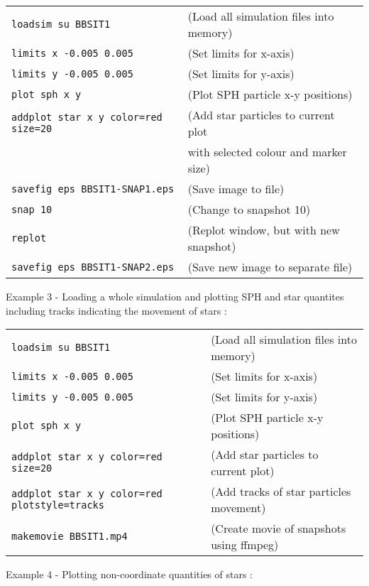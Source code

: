 \documentclass[a4paper]{article}
\newcommand{\var}[1]{\texttt{#1}}
\begin{document}
\begin{tabular}{p{7cm}p{6cm}}
\var{loadsim su BBSIT1} &              (Load all simulation files into memory) \\
\var{limits x -0.005 0.005} &          (Set limits for x-axis) \\
\var{limits y -0.005 0.005} &         (Set limits for y-axis) \\
\var{plot sph x y} &                   (Plot SPH particle x-y positions) \\
\var{addplot star x y color=red size=20} & (Add star particles to current plot \\
                                        & with selected colour and marker size) \\
\var{savefig eps BBSIT1-SNAP1.eps} &   (Save image to file) \\
\var{snap 10}                      &   (Change to snapshot 10) \\
\var{replot}                       &   (Replot window, but with new snapshot)\\
\var{savefig eps BBSIT1-SNAP2.eps} &   (Save new image to separate file)
\end{tabular}
\newline


\noindent Example 3 - Loading a whole simulation and plotting SPH and star quantites including tracks indicating the movement of stars : \\

\begin{tabular}{p{7cm}p{6cm}}
\var{loadsim su BBSIT1} &               (Load all simulation files into memory) \\
\var{limits x -0.005 0.005} &           (Set limits for x-axis) \\
\var{limits y -0.005 0.005} &           (Set limits for y-axis) \\
\var{plot sph x y} &                    (Plot SPH particle x-y positions) \\
\var{addplot star x y color=red size=20} &  (Add star particles to current plot) \\
\var{addplot star x y color=red plotstyle=tracks} &            (Add tracks of star particles movement) \\
    
\var{makemovie BBSIT1.mp4} &             (Create movie of snapshots using ffmpeg)
\end{tabular}
\newline


\noindent Example 4 - Plotting non-coordinate quantities of stars : \\
\end{document}
